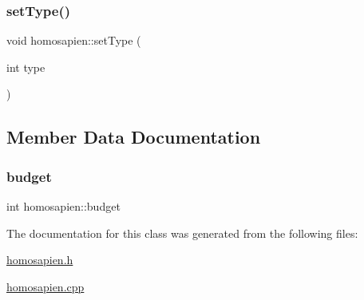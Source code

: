 \mbox{\label{classhomosapien_aa868001c96c4c26e5cbe85d7d75c738e}} 
\subsubsection{\texorpdfstring{set\+Type()}{setType()}\hspace{0.1cm}{\footnotesize\ttfamily [2/2]}}
{\footnotesize\ttfamily void homosapien\+::set\+Type (\begin{DoxyParamCaption}\item[{int}]{type }\end{DoxyParamCaption})}



\subsection{Member Data Documentation}
\mbox{\label{classhomosapien_a8e16a7132ce68bb9026113200f7599ad}} 
\subsubsection{\texorpdfstring{budget}{budget}}
{\footnotesize\ttfamily int homosapien\+::budget}



The documentation for this class was generated from the following files\+:\begin{DoxyCompactItemize}
\item 
\hyperlink{homosapien_8h}{homosapien.\+h}\item 
\hyperlink{homosapien_8cpp}{homosapien.\+cpp}\end{DoxyCompactItemize}
